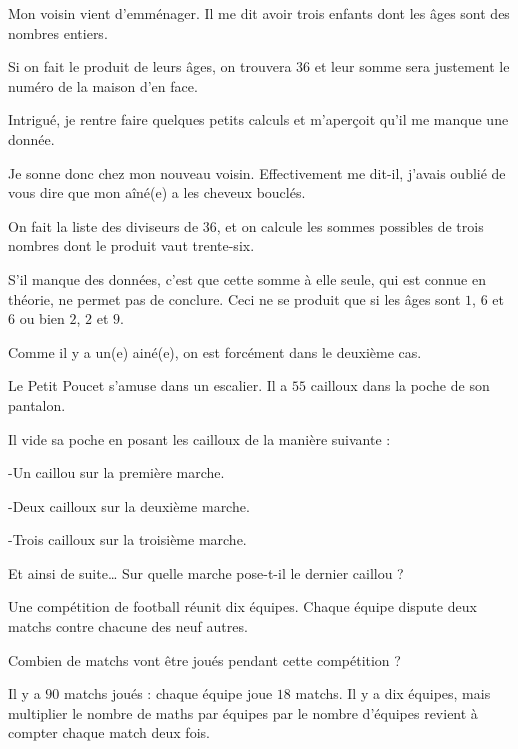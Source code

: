 \begin{exo}

Mon voisin vient d'emménager. Il me dit avoir trois enfants dont les âges sont des nombres entiers.

Si on fait le produit de leurs âges, on trouvera $36$ et leur somme sera justement le numéro de la maison d'en face.

Intrigué, je rentre faire quelques petits calculs et m'aperçoit qu'il me manque une donnée.

Je sonne donc chez mon nouveau voisin. Effectivement me dit-il, j'avais oublié de vous dire que mon aîné(e) a les cheveux bouclés.

\begin{sol}
On fait la liste des diviseurs de $36$, et on calcule les sommes possibles de trois nombres dont le produit vaut trente-six.

S'il manque des données, c'est que cette somme à elle seule, qui est connue en théorie, ne permet pas de conclure. Ceci ne se produit que si les âges sont $1$, $6$ et $6$ ou bien $2$, $2$ et $9$.

Comme il y a un(e) ainé(e), on est forcément dans le deuxième cas.
\end{sol}
\end{exo}



\begin{exo}
Le Petit Poucet s’amuse dans un escalier. Il a $55$ cailloux dans la poche de son pantalon.

Il vide sa poche en posant les cailloux de la manière suivante :

-Un caillou sur la première marche.

-Deux cailloux sur la deuxième marche.

-Trois cailloux sur la troisième marche.

Et ainsi de suite… Sur quelle marche pose-t-il le dernier caillou ?
\end{exo}

\begin{exo}
Une compétition de football réunit dix équipes. Chaque équipe dispute deux matchs contre chacune des neuf autres.

Combien de matchs vont être joués pendant cette compétition ?
\begin{sol}
Il y a $90$ matchs joués : chaque équipe joue $18$ matchs. Il y a dix équipes, mais multiplier le nombre de maths par équipes par le nombre d'équipes revient à compter chaque match deux fois.
\end{sol} 
\end{exo}



